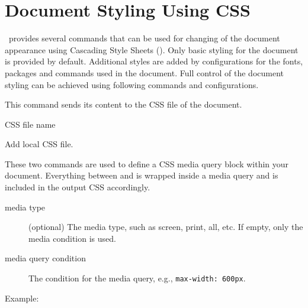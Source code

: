 \section{Document Styling Using CSS}
\label{sec:css-styling}

\texfourht\ provides several commands that can be used for changing of the
document appearance using Cascading Style Sheets (\css). Only basic styling for
the document is provided by default. Additional styles are added by configurations for the
fonts, packages and commands used in the document. Full control of the document
styling can be achieved using following commands and configurations.



This command sends its content to the CSS file of the document. 

 {CSS file name}\EndDoc

Add local CSS file.

\begin{texsource}
\end{texsource}

\EndDoc
{}

These two commands are used to define a CSS media query block within your
document. Everything between  and  is
wrapped inside a media query and is included in the output CSS accordingly.

\begin{description}
  \item[media type] (optional) The media type, such as screen, print, all, etc. If empty, only the media condition is used.

  \item[media query condition] The condition for the media query, e.g., \texttt{max-width: 600px}.
  
\end{description}


Example:


\begin{texsource}
\CssMediaQueryEnd
\end{texsource}

